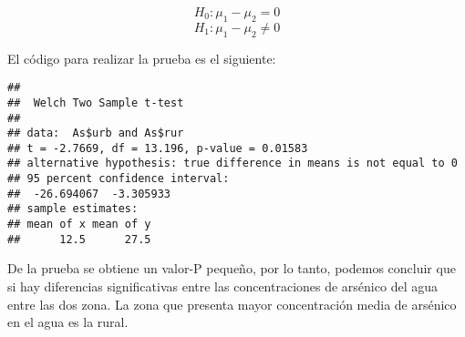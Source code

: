 \documentclass[
]{article}
\newenvironment{Shaded}{}{}
\newcommand{\AttributeTok}[1]{\textcolor[rgb]{0.49,0.56,0.16}{#1}}
\newcommand{\ConstantTok}[1]{\textcolor[rgb]{0.53,0.00,0.00}{#1}}
\newcommand{\DecValTok}[1]{\textcolor[rgb]{0.25,0.63,0.44}{#1}}
\newcommand{\FloatTok}[1]{\textcolor[rgb]{0.25,0.63,0.44}{#1}}
\newcommand{\FunctionTok}[1]{\textcolor[rgb]{0.02,0.16,0.49}{#1}}
\newcommand{\NormalTok}[1]{#1}
\newcommand{\SpecialCharTok}[1]{\textcolor[rgb]{0.25,0.44,0.63}{#1}}
\newcommand{\StringTok}[1]{\textcolor[rgb]{0.25,0.44,0.63}{#1}}
\begin{document}
\[H_0: \mu_1  - \mu_2 = 0\] \[H_1: \mu_1  - \mu_2 \neq 0\]

El código para realizar la prueba es el siguiente:

\begin{Shaded}
\end{Shaded}

\begin{verbatim}
## 
##  Welch Two Sample t-test
## 
## data:  As$urb and As$rur
## t = -2.7669, df = 13.196, p-value = 0.01583
## alternative hypothesis: true difference in means is not equal to 0
## 95 percent confidence interval:
##  -26.694067  -3.305933
## sample estimates:
## mean of x mean of y 
##      12.5      27.5
\end{verbatim}

De la prueba se obtiene un valor-P pequeño, por lo tanto, podemos
concluir que si hay diferencias significativas entre las concentraciones
de arsénico del agua entre las dos zona. La zona que presenta mayor
concentración media de arsénico en el agua es la rural.
\end{document}
